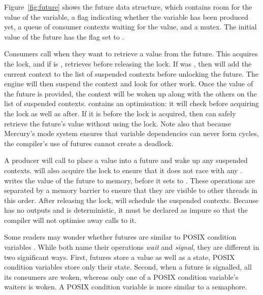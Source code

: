 Figure~\ref{fig:future} shows the future data structure,
which contains room for the value of the variable,
a flag indicating whether the variable has been produced yet,
a queue of consumer contexts waiting for the value, and a mutex.
The initial value of the future has the flag set to
.

Consumers call \wait when they want to retrieve a value from the future.
This acquires the lock, and if  is 
, retrieves
 before releasing the lock.
If  was ,
then \wait will add the current context to
the list of suspended contexts before unlocking the future.
The engine will then suspend the context and look for other work.
Once the value of the future is provided,
the context will be woken up along with the others on the list of suspended
contexts.
\wait contains an optimisation:
it will check  before
acquiring the lock as well as after.
If it is  before the lock is acquired,
then \wait can safely retrieve the
future's value without using the lock.
Note also that because Mercury's mode system ensures that variable
dependencies can never form cycles,
the compiler's use of futures cannot create a deadlock.

A producer will call \signal to place a value into a future and wake up any
suspended contexts.
\signal will also acquire the lock to ensure that it does not race with any \wait.
\signal writes the value of the future to memory,
before it sets 
 to .
These operations are separated by a memory barrier to ensure that they are
visible to other threads in this order.
After releasing the lock, \signal will schedule the suspended contexts.
Because \signal has no outputs and is deterministic,
it must be declared as impure so that the compiler will not optimise away calls
to it.

Some readers may wonder whether futures are similar to POSIX condition
variables \citep{butenhof1997:pthreads}.
While both name their operations \emph{wait} and \emph{signal},
they are different in two significant ways.
First,
futures store a value as well as a state,
POSIX condition variables store only their state.
Second,
when a future is signalled, all its consumers are woken,
whereas only one of a POSIX condition variable's waiters is woken.
A POSIX condition variable is more similar to a semaphore.

